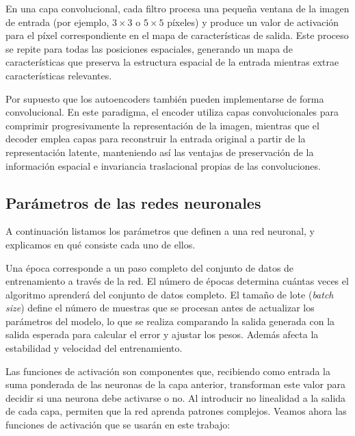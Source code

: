 En una capa convolucional, cada filtro procesa una pequeña ventana de la imagen de entrada (por ejemplo, $3\times3$ o $5\times5$ píxeles) y produce un valor de activación para el píxel correspondiente en el mapa de características de salida. Este proceso se repite para todas las posiciones espaciales, generando un mapa de características que preserva la estructura espacial de la entrada mientras extrae características relevantes.

Por supuesto que los autoencoders también pueden implementarse de forma convolucional. En este paradigma, el encoder utiliza capas convolucionales para comprimir progresivamente la representación de la imagen, mientras que el decoder emplea capas para reconstruir la entrada original a partir de la representación latente, manteniendo así las ventajas de preservación de la información espacial e invariancia traslacional propias de las convoluciones.

\subsection{Parámetros de las redes neuronales}\label{sec:params_red}

A continuación listamos los parámetros que definen a una red neuronal, y explicamos en qué consiste cada uno de ellos.

Una época corresponde a un paso completo del conjunto de datos de entrenamiento a través de la red. El número de épocas determina cuántas veces el algoritmo aprenderá del conjunto de datos completo.  El tamaño de lote (\emph{batch size}) define el número de muestras que se procesan antes de actualizar los parámetros del modelo, lo que se realiza comparando la salida generada con la salida esperada para calcular el error y ajustar los pesos. Además afecta la estabilidad y velocidad del entrenamiento.


Las funciones de activación son componentes que, recibiendo como entrada la suma ponderada de las neuronas de la capa anterior, transforman este valor para decidir si una neurona debe activarse o no. Al introducir no linealidad a la salida de cada capa, permiten que la red aprenda patrones complejos. Veamos ahora las funciones de activación que se usarán en este trabajo:

